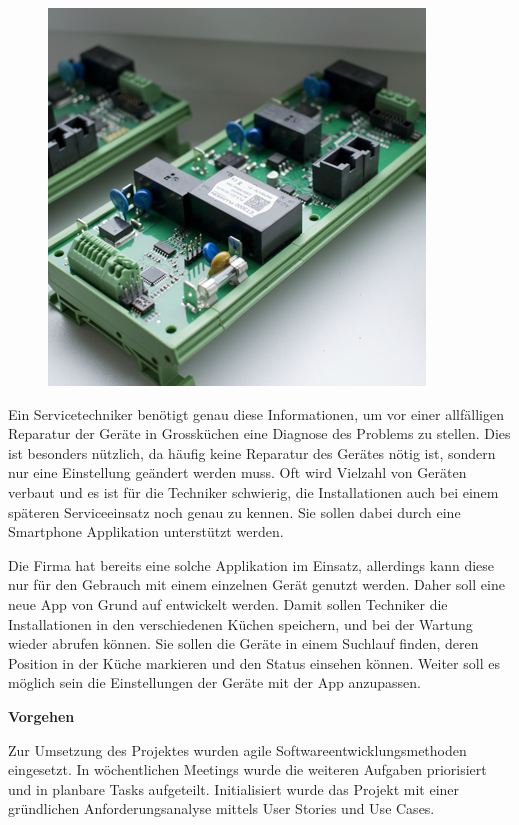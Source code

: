 \begin{figure}
	\vspace{-0.5cm}
	\begin{center}
		\includegraphics[scale=1]{start/img/img_7689}
	\end{center}
	\vspace{-0.5cm}
\end{figure}

Ein Servicetechniker benötigt genau diese Informationen, um vor einer allfälligen Reparatur der Geräte in Grossküchen eine Diagnose des Problems zu stellen. Dies ist besonders nützlich, da häufig keine Reparatur des Gerätes nötig ist, sondern nur eine Einstellung geändert werden muss. Oft wird Vielzahl von Geräten verbaut und es ist für die Techniker schwierig, die Installationen auch bei einem späteren Serviceeinsatz noch genau zu kennen. Sie sollen dabei durch eine Smartphone Applikation unterstützt werden.

Die Firma hat bereits eine solche Applikation im Einsatz, allerdings kann diese nur für den Gebrauch mit einem einzelnen Gerät genutzt werden. Daher soll eine neue App von Grund auf entwickelt werden. Damit sollen Techniker die Installationen in den verschiedenen Küchen speichern, und bei der Wartung wieder abrufen können. Sie sollen die Geräte in einem Suchlauf finden, deren Position in der Küche markieren und den Status einsehen können. Weiter soll es möglich sein die Einstellungen der Geräte mit der App anzupassen.

\textbf{Vorgehen}

Zur Umsetzung des Projektes wurden agile Softwareentwicklungsmethoden eingesetzt. In  wöchentlichen Meetings wurde die weiteren Aufgaben priorisiert und in planbare Tasks aufgeteilt. Initialisiert wurde das Projekt mit einer gründlichen Anforderungsanalyse mittels User Stories und Use Cases. 

